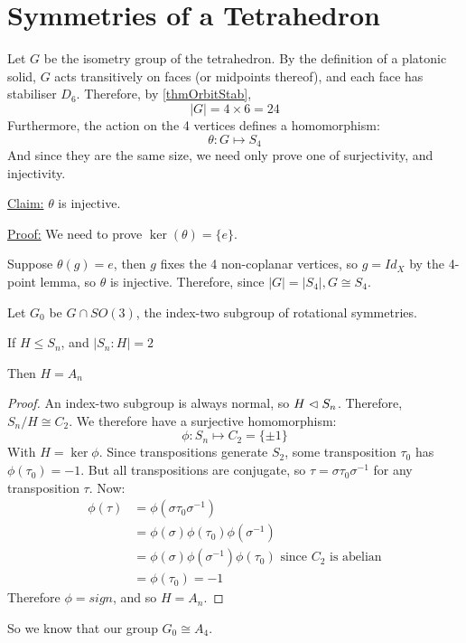 \documentclass[../Main.tex]{subfiles}
\begin{document}
\section{Symmetries of a Tetrahedron}
\begin{example} %
    Let $G$ be the isometry group of the tetrahedron. By the definition of a platonic solid, $G$ acts transitively on faces (or midpoints thereof), and each face has stabiliser $D_6$. Therefore, by \ref{thmOrbitStab},
    \begin{equation*}
        |G| = 4 \times 6 = 24
    \end{equation*}
    Furthermore, the action on the 4 vertices defines a homomorphism:
    \begin{equation*}
        \theta : G \mapsto S_4
    \end{equation*}
    And since they are the same size, we need only prove one of surjectivity, and injectivity.\par
    \underline{Claim:} $\theta$ is injective.\par
    \underline{Proof:} We need to prove $\ker(\theta) = \{e\}$.\par
    Suppose $\theta(g) = e$, then $g$ fixes the 4 non-coplanar vertices, so $g = Id_X$ by the 4-point lemma, so $\theta$ is injective.
    Therefore, since $|G| = |S_4|, G \cong S_4$.
\end{example}
Let $G_0$ be $G \cap SO(3)$, the index-two subgroup of rotational symmetries.
\begin{lemma}[Uniqueness of $A_n$]
    If $H \leq S_n$, and $|S_n : H| = 2$\par
    Then $H = A_n$
\end{lemma}
\begin{proof}
    An index-two subgroup is always normal, so $H \vartriangleleft S_n$. Therefore, $S_n / H \cong C_2$. We therefore have a surjective homomorphism:
    \begin{equation*}
        \phi : S_n \mapsto C_2 = \{\pm 1\}
    \end{equation*}
    With $H = \ker{\phi}$. Since transpositions generate $S_2$, some transposition $\tau_0$ has $\phi(\tau_0) = -1$. But all transpositions are conjugate, so $\tau = \sigma \tau_0 \sigma^{-1}$ for any transposition $\tau$. Now:
    \begin{align*}
        \phi(\tau) &= \phi(\sigma \tau_0 \sigma^{-1}) \\
        &= \phi(\sigma) \phi(\tau_0) \phi(\sigma^{-1}) \\
        &= \phi(\sigma) \phi(\sigma^{-1}) \phi(\tau_0) \text{ since } C_2 \text{ is abelian} \\
        &= \phi(\tau_0) = -1
    \end{align*}
    Therefore $\phi = sign$, and so $H = A_n$.
\end{proof}
So we know that our group $G_0 \cong A_4$.
\end{document}
